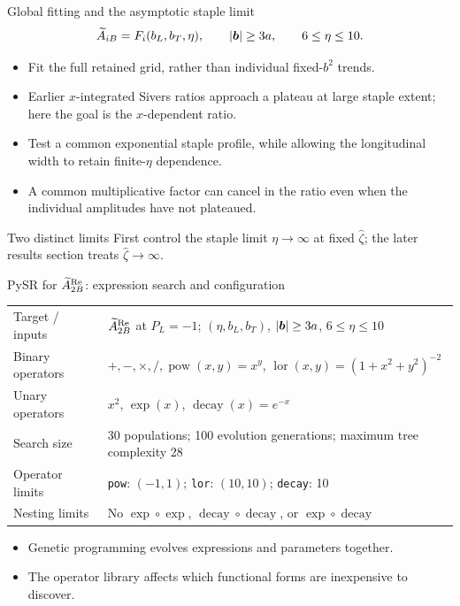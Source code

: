 \begin{frame}{Global fitting and the asymptotic staple limit}
\[
\widetilde{A}_{iB}=F_i(b_L,b_T,\eta),\qquad |\boldsymbol{b}|\ge3a,\qquad6\le\eta\le10.
\]
\begin{itemize}
\item Fit the full retained grid, rather than individual fixed-$b^2$ trends.
\item Earlier $x$-integrated Sivers ratios approach a plateau at large staple extent; here the goal is the $x$-dependent ratio.
\item Test a common exponential staple profile, while allowing the longitudinal width to retain finite-$\eta$ dependence.
\item A common multiplicative factor can cancel in the ratio even when the individual amplitudes have not plateaued.
\end{itemize}
\begin{block}{Two distinct limits}
First control the staple limit $\eta\to\infty$ at fixed $\hat\zeta$; the later results section treats $\hat\zeta\to\infty$.
\end{block}
\end{frame}

\begin{frame}{PySR for $\widetilde{A}_{2B}^{\text{Re}}$: expression search and configuration}
\small
\begin{tabular}{p{}p{}}
\toprule
Target / inputs & $\widetilde{A}_{2B}^{\text{Re}}$ at $P_L=-1$; $(\eta,b_L,b_T)$, $|\boldsymbol{b}|\ge3a$, $6\le\eta\le10$ \\[1mm]
Binary operators & $+,-,\times,/,\operatorname{pow}(x,y)=x^y$, $\operatorname{lor}(x,y)=(1+x^2+y^2)^{-2}$ \\[1mm]
Unary operators & $x^2$, $\exp(x)$, $\operatorname{decay}(x)=e^{-x}$ \\[1mm]
Search size & 30 populations; 100 evolution generations; maximum tree complexity 28 \\[1mm]
Operator limits & \texttt{pow}: $(-1,1)$; \texttt{lor}: $(10,10)$; \texttt{decay}: 10 \\[1mm]
Nesting limits & No $\exp\circ\exp$, $\operatorname{decay}\circ\operatorname{decay}$, or $\exp\circ\operatorname{decay}$ \\
\bottomrule
\end{tabular}
\medskip
\begin{itemize}
\item Genetic programming evolves expressions and parameters together.
\item The operator library affects which functional forms are inexpensive to discover.
\end{itemize}
\end{frame}

